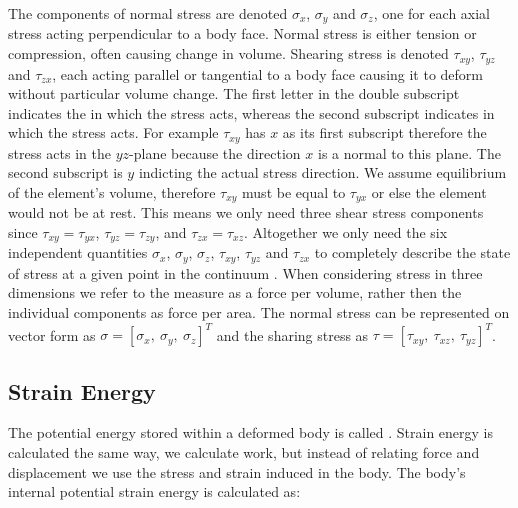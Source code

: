 The components of normal stress are denoted $\sigma_x$,
$\sigma_y$ and $\sigma_z$, one for each axial stress acting
perpendicular to a body face. Normal stress is either tension or
compression, often causing change in volume. Shearing stress is
denoted $\tau_{xy}$, $\tau_{yz}$ and $\tau_{zx}$, each
acting parallel or tangential to a body face causing it
to deform without particular volume change.
The first letter in the double subscript
indicates the  in which the stress acts, whereas the second
subscript indicates in which  the stress
acts.
For example $\tau_{xy}$ has $x$ as its first
subscript therefore the stress acts in the $yz$-plane because the
direction $x$ is a normal to this plane. The second subscript
is $y$ indicting the actual stress direction.
%
We assume equilibrium of the element's volume, therefore $\tau_{xy}$
must be equal to $\tau_{yx}$ or else the element would not be at
rest. This means we only need three shear stress components since
$\tau_{xy} = \tau_{yx}$, $\tau_{yz} = \tau_{zy}$, and $\tau_{zx} =
\tau_{xz}$.
Altogether we only need the six independent quantities $\sigma_x$,
$\sigma_y$, $\sigma_z$, $\tau_{xy}$, $\tau_{yz}$ and $\tau_{zx}$ to completely
describe the state of stress at a given point in the
continuum .
%
When considering stress in three dimensions we refer to the measure as
a force per volume, rather then the individual components as force per
area. The normal stress can be represented on vector form as
$\sigma = [ \sigma_{x}, \ \sigma_{y}, \ \sigma_{z} ]^T$ and the
sharing stress as 
$\tau = [ \tau_{xy}, \ \tau_{xz}, \ \tau_{yz} ]^T$.

\subsection{Strain Energy}
The potential energy stored within a deformed body is called . Strain energy is calculated the same way, we calculate
work, but instead of relating force and displacement we use the stress
and strain induced in the body. The body's internal potential strain
energy is calculated as:

